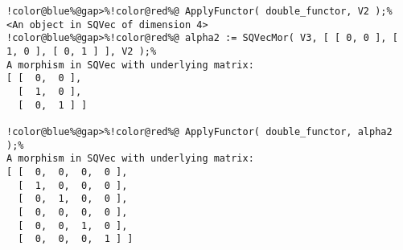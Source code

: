 \begin{Verbatim}[commandchars=!@\%,frame=single]
!color@blue%@gap>%!color@red%@ ApplyFunctor( double_functor, V2 );%
<An object in SQVec of dimension 4>
!color@blue%@gap>%!color@red%@ alpha2 := SQVecMor( V3, [ [ 0, 0 ], [ 1, 0 ], [ 0, 1 ] ], V2 );%
A morphism in SQVec with underlying matrix:
[ [  0,  0 ],
  [  1,  0 ],
  [  0,  1 ] ]

!color@blue%@gap>%!color@red%@ ApplyFunctor( double_functor, alpha2 );%
A morphism in SQVec with underlying matrix:
[ [  0,  0,  0,  0 ],
  [  1,  0,  0,  0 ],
  [  0,  1,  0,  0 ],
  [  0,  0,  0,  0 ],
  [  0,  0,  1,  0 ],
  [  0,  0,  0,  1 ] ]

\end{Verbatim}

